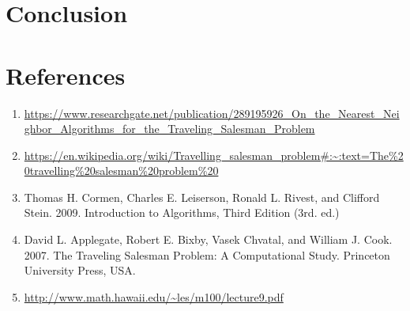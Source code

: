 \documentclass[12pt]{report}
\begin{document}
\chapter{Conclusion}
\newpage
\chapter{References}
\begin{enumerate}
	\item \url{https://www.researchgate.net/publication/289195926_On_the_Nearest_Neighbor_Algorithms_for_the_Traveling_Salesman_Problem}
	\item \url{https://en.wikipedia.org/wiki/Travelling_salesman_problem#:~:text=The\%20travelling\%20salesman\%20problem\%20}
	\item Thomas H. Cormen, Charles E. Leiserson, Ronald L. Rivest, and Clifford Stein. 2009. Introduction to Algorithms, Third Edition (3rd. ed.)
	\item David L. Applegate, Robert E. Bixby, Vasek Chvatal, and William J. Cook. 2007. The Traveling Salesman Problem: A Computational Study. Princeton University Press, USA.
	\item\url{http://www.math.hawaii.edu/~les/m100/lecture9.pdf}
\end{enumerate}
\end{document}
